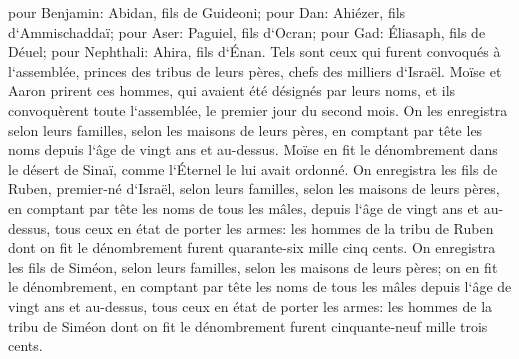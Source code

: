 \verse pour Benjamin: Abidan, fils de Guideoni; 
\verse pour Dan: Ahiézer, fils d`Ammischaddaï; 
\verse pour Aser: Paguiel, fils d`Ocran; 
\verse pour Gad: Éliasaph, fils de Déuel; 
\verse pour Nephthali: Ahira, fils d`Énan. 
\verse Tels sont ceux qui furent convoqués à l`assemblée, princes des tribus de leurs pères, chefs des milliers d`Israël. 
\verse Moïse et Aaron prirent ces hommes, qui avaient été désignés par leurs noms, 
\verse et ils convoquèrent toute l`assemblée, le premier jour du second mois. On les enregistra selon leurs familles, selon les maisons de leurs pères, en comptant par tête les noms depuis l`âge de vingt ans et au-dessus. 
\verse Moïse en fit le dénombrement dans le désert de Sinaï, comme l`Éternel le lui avait ordonné. 
\verse On enregistra les fils de Ruben, premier-né d`Israël, selon leurs familles, selon les maisons de leurs pères, en comptant par tête les noms de tous les mâles, depuis l`âge de vingt ans et au-dessus, tous ceux en état de porter les armes: 
\verse les hommes de la tribu de Ruben dont on fit le dénombrement furent quarante-six mille cinq cents. 
\verse On enregistra les fils de Siméon, selon leurs familles, selon les maisons de leurs pères; on en fit le dénombrement, en comptant par tête les noms de tous les mâles depuis l`âge de vingt ans et au-dessus, tous ceux en état de porter les armes: 
\verse les hommes de la tribu de Siméon dont on fit le dénombrement furent cinquante-neuf mille trois cents. 

